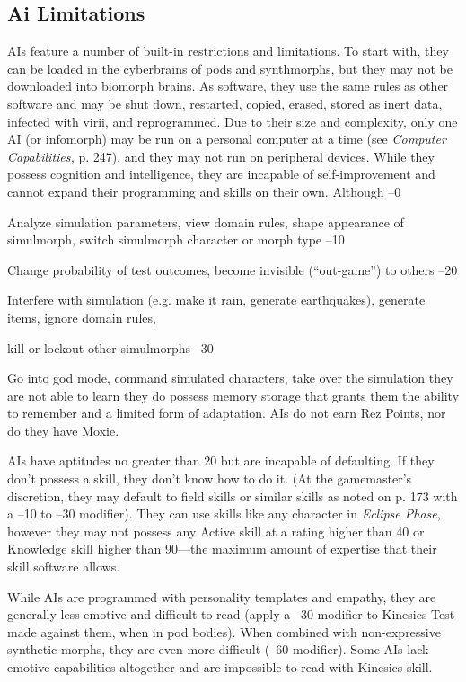 \subsection{Ai Limitations}

AIs feature a number of built-in restrictions and 
limitations. To start with, they can be loaded in the 
cyberbrains of pods and synthmorphs, but they may 
not be downloaded into biomorph brains. As software, 
they use the same rules as other software and may be 
shut down, restarted, copied, erased, stored as inert 
data, infected with virii, and reprogrammed. Due to 
their size and complexity, only one AI (or infomorph) 
may be run on a personal computer at a time (see 
\textit{Computer Capabilities,} p. 247), and they may not run 
on peripheral devices.
While they possess cognition and intelligence, they 
are incapable of self-improvement and cannot expand 
their programming and skills on their own. Although 
–0

Analyze simulation parameters, view domain rules, shape appearance of simulmorph, switch simulmorph character or morph type
–10

Change probability of test outcomes, become invisible (``out-game'') to others
–20

Interfere with simulation (e.g. make it rain, generate earthquakes), generate items, ignore domain rules, 

kill or lockout other simulmorphs
–30

Go into god mode, command simulated characters, take over the simulation
they are not able to learn they do possess memory 
storage that grants them the ability to remember and 
a limited form of adaptation. AIs do not earn Rez 
Points, nor do they have Moxie.

AIs have aptitudes no greater than 20 but are 
incapable of defaulting. If they don't possess a skill, 
they don't know how to do it. (At the gamemaster's 
discretion, they may default to field skills or similar 
skills as noted on p. 173 with a –10 to –30 modifier). 
They can use skills like any character in \textit{Eclipse Phase}, 
however they may not possess any Active skill at a 
rating higher than 40 or Knowledge skill higher than 
90—the maximum amount of expertise that their skill 
software allows.

While AIs are programmed with personality templates
and empathy, they are generally less emotive
and difficult to read (apply a –30 modifier to Kinesics 
Test made against them, when in pod bodies). When 
combined with non-expressive synthetic morphs, they 
are even more difficult (–60 modifier). Some AIs lack 
emotive capabilities altogether and are impossible to 
read with Kinesics skill.

